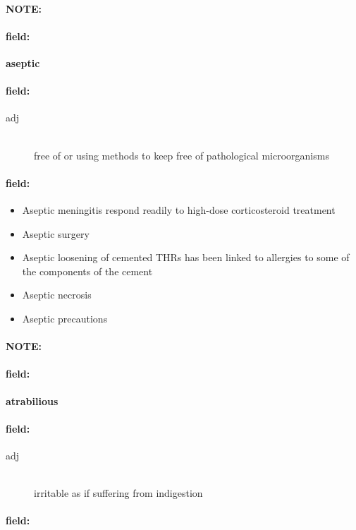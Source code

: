 \documentclass[12pt]{article}
\newenvironment{note}{\paragraph{NOTE:}}{}
\newenvironment{field}{\paragraph{field:}}{}
\begin{document}
\begin{note}
\begin{field}
\textbf{\large aseptic}
\end{field}


\begin{field}
\begin{description}
\item[adj] \hfill \\ 
free of or using methods to keep free of pathological microorganisms

\end{description}
\end{field}

\begin{field}
\begin{itemize}
\item Aseptic meningitis respond readily to high-dose corticosteroid treatment
\item Aseptic surgery
\item Aseptic loosening of cemented THRs has been linked to allergies to some of the components of the cement
\item Aseptic necrosis
\item Aseptic precautions
\end{itemize}
\end{field}
\end{note}
\begin{note}
\begin{field}
\textbf{\large atrabilious}
\end{field}


\begin{field}
\begin{description}
\item[adj] \hfill \\ 
irritable as if suffering from indigestion

\end{description}
\end{field}

\begin{field}
\end{field}
\end{note}
\end{document}
